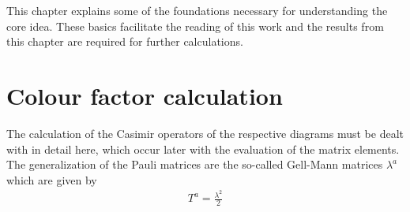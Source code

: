 This chapter explains some of the foundations necessary for understanding the core idea. These basics facilitate the reading of this work and the results from this chapter are required for further calculations. 

\section{Colour factor calculation}
\label{col}
The calculation of the Casimir operators of the respective diagrams must be dealt with in detail here, which occur later with the evaluation of the matrix elements. The generalization of the Pauli matrices are the so-called Gell-Mann matrices $\lambda ^a$ which are given by \cite{Schwartz:2013pla, Platzer:2018pmd}
\begin{equation}
\begin{split}
T^a =  \frac{\lambda ^2}{2}
\end{split}
\end{equation}

